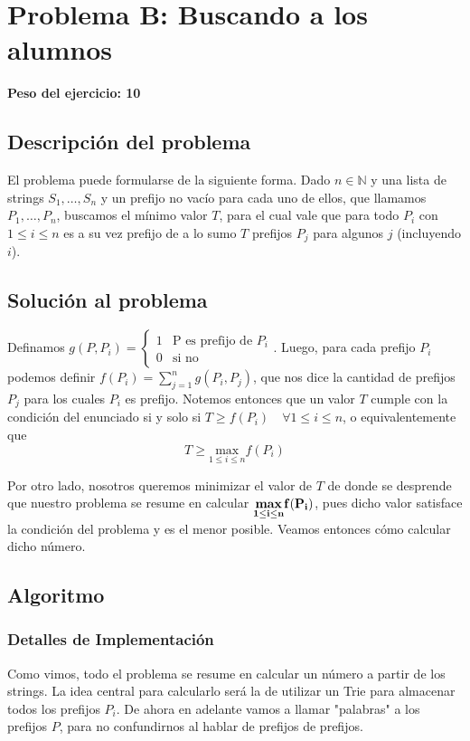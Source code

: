 \newpage{}
\section{Problema B:  Buscando a los alumnos}
\textbf{Peso del ejercicio: 10 }
\subsection{Descripción del problema}
	El problema puede formularse de la siguiente forma. Dado $n \in  \mathbb{N}$ y una lista de strings $S_1, \dots, S_n$ y un prefijo no vacío para cada uno de ellos,  que llamamos $P_1, \dots, P_n$, buscamos el mínimo valor $T$, para el cual vale que para todo $P_i$ con $ 1 \leq i \leq n $ es a su vez prefijo de a lo sumo $T$ prefijos $P_j$ para algunos $j$ (incluyendo $i$).
\subsection{Solución al problema}

	Definamos $g(P,P_i) =
\left\{\begin{matrix}
 1 & \text{P es prefijo de } P_i \\ 
 0 & \text{si no}
\end{matrix}\right.$. Luego, para cada prefijo $P_i$ podemos definir $f(P_i) = \sum\limits_{j = 1}^n g(P_i,P_j)$, que nos dice la cantidad de prefijos $P_j$ para los cuales $P_i$ es prefijo. Notemos entonces que un valor $T$ cumple con la condición del enunciado si y solo si $T \geq f(P_i) \quad \forall 1 \leq i \leq n$, o equivalentemente que $$ \boxed{T \geq \underset{1 \leq i \leq n}{\text{max}} f(P_i) }   $$

	Por otro lado, nosotros queremos minimizar el valor de $T$ de donde se desprende que nuestro problema se resume en calcular $\bf \underset{1 \leq i \leq n}{\textbf{max}} f(P_i)$, pues dicho valor satisface la condición del problema y es el menor posible. Veamos entonces cómo calcular dicho número.


\subsection{Algoritmo}

\subsubsection{Detalles de Implementación}

	Como vimos, todo el problema se resume en calcular un número a partir de los strings. La idea central para calcularlo será la de utilizar un Trie para almacenar todos los prefijos $P_i$. De ahora en adelante vamos a llamar "palabras" a los prefijos $P$, para no confundirnos al hablar de prefijos de prefijos.
	
